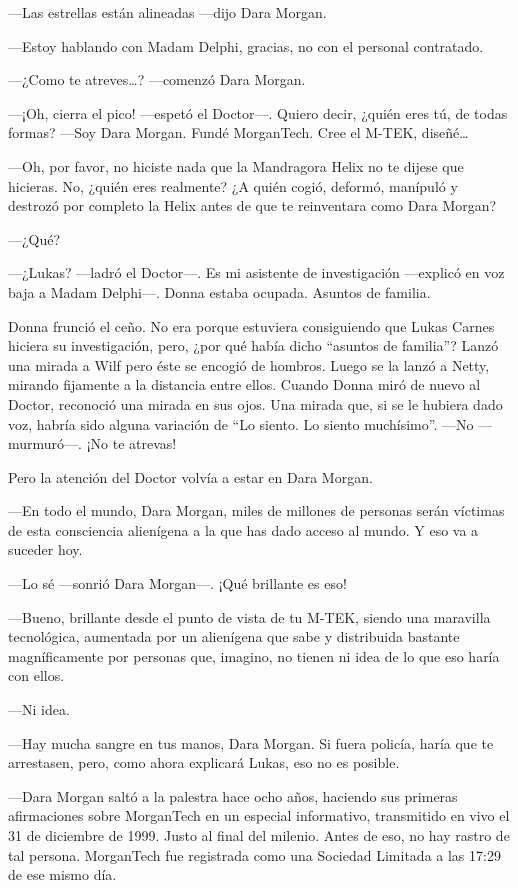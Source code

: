 ---Las estrellas están alineadas ---dijo Dara Morgan.

---Estoy hablando con Madam Delphi, gracias, no con el personal
contratado.

---¿Como te atreves\ldots{}? ---comenzó Dara Morgan.

---¡Oh, cierra el pico! ---espetó el Doctor---. Quiero decir, ¿quién
eres tú, de todas formas? ---Soy Dara Morgan. Fundé MorganTech. Cree el
M-TEK, diseñé\ldots{}~

---Oh, por favor, no hiciste nada que la Mandragora Helix no te dijese
que hicieras. No, ¿quién eres realmente? ¿A quién cogió, deformó,
manípuló y destrozó por completo la Helix antes de que te reinventara
como Dara Morgan?

---¿Qué?

---¿Lukas? ---ladró el Doctor---. Es mi asistente de investigación
---explicó en voz baja a Madam Delphi---. Donna estaba ocupada. Asuntos
de familia.

Donna frunció el ceño. No era porque estuviera consiguiendo que Lukas
Carnes hiciera su investigación, pero, ¿por qué había dicho ``asuntos de
familia''? Lanzó una mirada a Wilf pero éste se encogió de hombros.
Luego se la lanzó a Netty, mirando fijamente a la distancia entre ellos.
Cuando Donna miró de nuevo al Doctor, reconoció una mirada en sus ojos.
Una mirada que, si se le hubiera dado voz, habría sido alguna variación
de ``Lo siento. Lo siento muchísimo''. ---No ---murmuró---. ¡No te
atrevas!

Pero la atención del Doctor volvía a estar en Dara Morgan.

---En todo el mundo, Dara Morgan, miles de millones de personas serán
víctimas de esta consciencia alienígena a la que has dado acceso al
mundo. Y eso va a suceder hoy.

---Lo sé ---sonrió Dara Morgan---. ¡Qué brillante es eso!

---Bueno, brillante desde el punto de vista de tu M-TEK, siendo una
maravilla tecnológica, aumentada por un alienígena que sabe y
distribuida bastante magníficamente por personas que, imagino, no tienen
ni idea de lo que eso haría con ellos.

---Ni idea.

---Hay mucha sangre en tus manos, Dara Morgan. Si fuera policía, haría
que te arrestasen, pero, como ahora explicará Lukas, eso no es posible.

---Dara Morgan saltó a la palestra hace ocho años, haciendo sus primeras
afirmaciones sobre MorganTech en un especial informativo, transmitido en
vivo el 31 de diciembre de 1999. Justo al final del milenio. Antes de
eso, no hay rastro de tal persona. MorganTech fue registrada como una
Sociedad Limitada a las 17:29 de ese mismo día.

